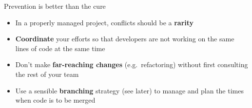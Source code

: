 \begin{frame}[fragile]{Prevention is better than the cure}
    \begin{itemize}
        \item In a properly managed project, conflicts should be a \textbf{rarity} \pause
        \item \textbf{Coordinate} your efforts so that developers are not working on the same lines of code
            at the same time \pause
        \item Don't make \textbf{far-reaching changes} (e.g.\ refactoring)
            without first consulting the rest of your team \pause
        \item Use a sensible \textbf{branching} strategy (see later) to manage and plan the times when
            code is to be merged
    \end{itemize}
\end{frame}

